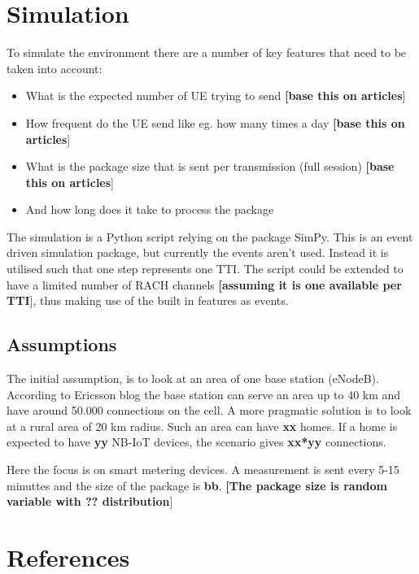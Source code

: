 \documentclass[10pt,a4paper,titlepage,twoside]{article}
\newcommand{\note}[1]{\textbf{[\color{ymablue}#1}]}
\newcommand{\hh}[1]{\textbf{\color{ymaorng} #1}}
\begin{document}
\section{Simulation}

To simulate the environment there are a number of key features that need to be taken into account:

\begin{itemize}
\item What is the expected number of UE trying to send \note{base this on articles}
\item How frequent do the UE send like eg. how many times a day \note{base this on articles}
\item What is the package size that is sent per transmission (full session) \note{base this on articles}
\item And how long does it take to process the package
\end{itemize}

The simulation is a Python script relying on the package SimPy. This is an event driven simulation package, but currently the events aren't used. Instead it is utilised such that one step represents one TTI. The script could be extended to have a limited number of RACH channels \note{assuming it is one available per TTI}, thus making use of the built in features as events.

\subsection{Assumptions}

The initial assumption, is to look at an area of one base station (eNodeB). According to Ericsson blog \cite{lme_web1} the base station can serve an area up to 40 km and have around 50.000 connections on the cell. A more pragmatic solution is to look at a rural area of 20 km radius. Such an area can have \hh{xx} homes. If a home is expected to have \hh{yy} NB-IoT devices, the scenario gives \hh{xx*yy} connections.

Here the focus is on smart metering devices. A measurement is sent every 5-15 minuttes and the size of the package is \hh{bb}. \note{The package size is random variable with ?? distribution}




\clearpage
\section{References}
\end{document}
